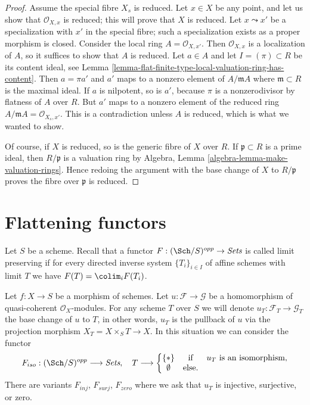 \begin{proof}
Assume the special fibre $X_s$ is reduced.
Let $x \in X$ be any point, and let us show that $\mathcal{O}_{X, x}$
is reduced; this will prove that $X$ is reduced.
Let $x \leadsto x'$ be a specialization with $x'$
in the special fibre; such a specialization exists
as a proper morphism is closed. Consider the local
ring $A = \mathcal{O}_{X, x'}$. Then $\mathcal{O}_{X, x}$
is a localization of $A$, so it suffices to show that
$A$ is reduced. Let $a \in A$ and let $I = (\pi) \subset R$ be its
content ideal, see
Lemma \ref{lemma-flat-finite-type-local-valuation-ring-has-content}.
Then $a = \pi a'$ and $a'$ maps to a nonzero element of
$A/\mathfrak mA$ where $\mathfrak m \subset R$ is the maximal ideal.
If $a$ is nilpotent, so is $a'$, because $\pi$ is a nonzerodivisor
by flatness of $A$ over $R$.
But $a'$ maps to a nonzero element of the reduced ring
$A/\mathfrak m A = \mathcal{O}_{X_s, x'}$.
This is a contradiction unless $A$ is reduced, which
is what we wanted to show.

\medskip\noindent
Of course, if $X$ is reduced, so is the generic fibre of $X$ over $R$.
If $\mathfrak p \subset R$ is a
prime ideal, then $R/\mathfrak p$ is a valuation ring by
Algebra, Lemma \ref{algebra-lemma-make-valuation-rings}.
Hence redoing the argument with the base change of $X$
to $R/\mathfrak p$ proves the fibre over $\mathfrak p$
is reduced.
\end{proof}






\section{Flattening functors}
\label{section-flattening-functors}

\noindent
Let $S$ be a scheme. Recall that a functor
$F : (\Sch/S)^{opp} \to \textit{Sets}$ is called limit preserving
if for every directed inverse system
$\{T_i\}_{i \in I}$ of affine schemes with limit $T$ we have
$F(T) = \colim_i F(T_i)$.

\begin{situation}
\label{situation-iso}
Let $f : X \to S$ be a morphism of schemes.
Let $u : \mathcal{F} \to \mathcal{G}$ be a homomorphism of
quasi-coherent $\mathcal{O}_X$-modules. For any scheme $T$ over
$S$ we will denote $u_T : \mathcal{F}_T \to \mathcal{G}_T$ the
base change of $u$ to $T$, in other words, $u_T$ is the pullback
of $u$ via the projection morphism $X_T = X \times_S T \to X$.
In this situation we can consider the functor
\begin{equation}
\label{equation-iso}
F_{iso} : (\Sch/S)^{opp} \longrightarrow \textit{Sets}, \quad
T \longrightarrow \left\{
\begin{matrix}
\{*\} & \text{if} & u_T \text{ is an isomorphism}, \\
\emptyset & \text{else.} &
\end{matrix}
\right.
\end{equation}
There are variants $F_{inj}$, $F_{surj}$, $F_{zero}$ where we ask that
$u_T$ is injective, surjective, or zero.
\end{situation}

